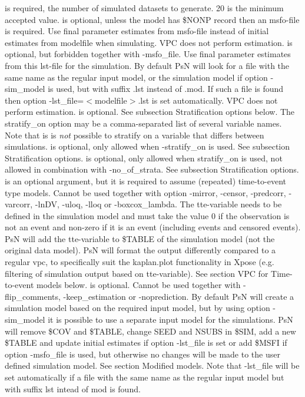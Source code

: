 \begin{optionlist}
is required, the number of simulated datasets to generate. 20 is the minimum accepted value. 
\nextopt
{}
is optional, unless the model has \$NONP record then an msfo-file 	is required. Use final parameter estimates from msfo-file instead of initial estimates from modelfile when simulating. VPC does not perform estimation. 
\nextopt
{}
is optional, but forbidden together with -msfo\_file. Use final parameter estimates from this lst-file for the simulation. By default PsN will look for a file with the same name as the regular input model, or the simulation model if option -sim\_model is used, but with suffix .lst instead of .mod. If such a file is found then option -lst\_file=$<$modelfile$>$.lst is set automatically. VPC does not perform estimation. 
\nextopt
{}
is optional. See subsection Stratification options below. The stratify\_on option may be a comma-separated list of several variable names. Note that is is
\emph{not} possible to stratify on a variable that differs between simulations. 
\nextopt
{}
is optional, only allowed when -stratify\_on is used. See subsection Stratification options.  
\nextopt
{}
is optional, only allowed when stratify\_on is used, not allowed in combination with -no\_of\_strata. See subsection Stratification options.  
\nextopt
{}
is an optional argument, but it is required to assume (repeated) time-to-event type models. Cannot be used together with option -mirror, -censor, -predcorr, -varcorr,  -lnDV, -uloq, -lloq or -boxcox\_lambda. The tte-variable needs to be defined in the simulation model and must take the value 0 if the observation is not an event and non-zero if it is an event (including events and censored events). PsN will add the tte-variable to \mbox{\$TABLE} of the simulation model (not the original data model). PsN will format the output differently compared to a regular vpc, to specifically suit the kaplan.plot functionality in Xpose (e.g. filtering of simulation output based on tte-variable). See section VPC for Time-to-event models below.   
\nextopt
{}
is optional. Cannot be used together with -flip\_comments, \mbox{-keep\_estimation} or -noprediction. By default PsN will create a simulation model based on the  required input model, but by using option -sim\_model it is possible to use a separate input model for the simulations. PsN will remove \$COV and \mbox{\$TABLE}, change SEED and NSUBS in \$SIM, add a new \mbox{\$TABLE} and  update initial estimates if option -lst\_file is set or add \$MSFI if option -msfo\_file is used, but otherwise no changes will be made to the user defined simulation model. See section Modified models. Note that -lst\_file will be set automatically if a file with the same name as the regular input model but with suffix lst intead of mod is found. 

\end{optionlist}

